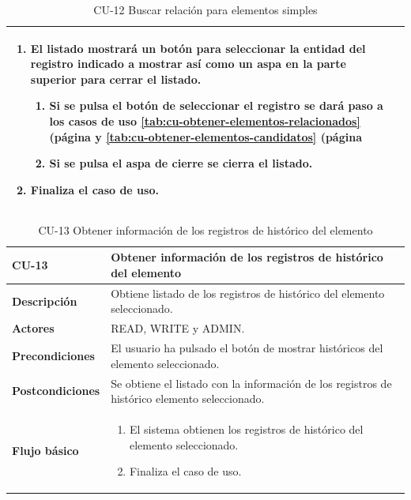 \begin{table} [H]
{\begin{tabular}{| m{3cm} | m{11cm} |}
\begin{enumerate}
		\item El listado mostrará un botón para seleccionar la entidad del registro indicado a mostrar así como un aspa en la parte superior para cerrar el listado.
		       \begin{enumerate}	
			        \item Si se pulsa el botón de seleccionar el registro se dará paso a los casos de uso \ref{tab:cu-obtener-elementos-relacionados} (página \pageref{tab:cu-obtener-elementos-relacionados} y \ref{tab:cu-obtener-elementos-candidatos} (página \pageref{tab:cu-obtener-elementos-candidatos}
			        \item Si se pulsa el aspa de cierre se cierra el listado.
			\end{enumerate}
		\item Finaliza el caso de uso.				
	  \end{enumerate} 	  	  
	  \\\hline
    \end{tabular}
    } %
    \caption{CU-12 Buscar relación para elementos simples}
    \label{tab:cu-buscar-relacion-elementos-historico}
\end{table}




\begin{table} [H]
    \centering
    \setlength{\leftmargini}{0.4cm}
	\resizebox{14cm}{!} { %
    \begin{tabular}{| m{3cm} | m{11cm} |}   
    \hline
	  \textbf{CU-13} & \textbf{Obtener información de los registros de histórico del elemento} \\\hline
	  \textbf{Descripción} & Obtiene listado de los registros de histórico del elemento seleccionado. \\\hline
	  \textbf{Actores} & READ, WRITE y ADMIN. \\\hline
	  \textbf{Precondiciones} & El usuario ha pulsado el botón de mostrar históricos del elemento seleccionado. \\\hline
	  \textbf{Postcondiciones} & Se obtiene el listado con la información de los registros de histórico elemento seleccionado. \\\hline
	  \textbf{Flujo básico} & 
		\begin{enumerate}
	  	\item El sistema obtienen los registros de histórico del elemento seleccionado.
		\item Finaliza el caso de uso.				
	  \end{enumerate} 	  	  
	  \\\hline
    \end{tabular}
    } %
    \caption{CU-13 Obtener información de los registros de histórico del elemento}
    \label{tab:cu-obtener-historicos}
\end{table}


